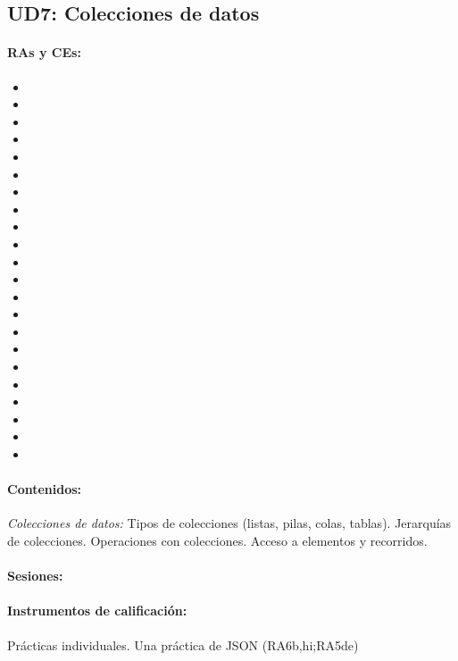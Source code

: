 \newpage
\subsection{UD7: Colecciones de datos}

	\paragraph{RAs y CEs:}
	\begin{itemize}[itemsep=0.1em, topsep=0.1em]
		\item\RAUNOf
		\item\RAUNOi		
		\item\RATRESe
		\item\RATRESf
		\item\RATRESg
		\item\RACINCOa
		\item\RACINCOb
		\item\RACINCOc
		\item\RADOSc
		\item\RADOSg
		\item\RADOSh
		\item\RADOSi
		\item\RASEISa
		\item\RASEISb
		\item\RASEISc
		\item\RASEISd
		\item\RASEISe
		\item\RASEISh
		\item\RASEISi
		\item\RASEISj
		\item\RACINCOd
		\item\RACINCOe
	\end{itemize}
	
	\paragraph{Contenidos:}
		\emph{Colecciones de datos:}
		Tipos de colecciones (listas, pilas, colas, tablas).
		Jerarquías de colecciones.
		Operaciones con colecciones. Acceso a elementos y recorridos.

	\paragraph{Sesiones:}
	\paragraph{Instrumentos de calificación:}
		Prácticas individuales. 
		Una práctica de JSON (RA6b,hi;RA5de)



